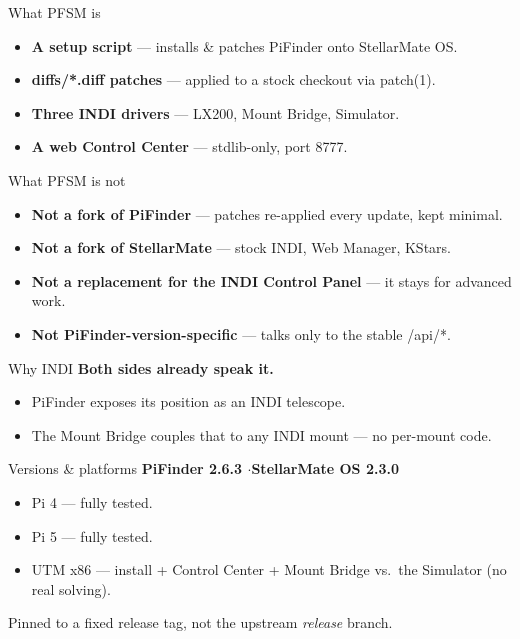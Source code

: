 \documentclass[12pt,english,aspectratio=1609]{beamer}
\newcommand{\code}[1]{{\ttfamily #1}}
\begin{document}
\begin{frame}[t]{What PFSM is}
\begin{itemize}
\item \textbf{A setup script} — installs \& patches PiFinder onto StellarMate OS.
\item \textbf{\code{diffs/*.diff} patches} — applied to a stock checkout via \code{patch(1)}.
\item \textbf{Three INDI drivers} — LX200, Mount Bridge, Simulator.
\item \textbf{A web Control Center} — stdlib-only, port 8777.
\end{itemize}
\end{frame}

\begin{frame}[t]{What PFSM is not}
\begin{itemize}
\item \textbf{Not a fork of PiFinder} — patches re-applied every update, kept minimal.
\item \textbf{Not a fork of StellarMate} — stock INDI, Web Manager, KStars.
\item \textbf{Not a replacement for the INDI Control Panel} — it stays for advanced work.
\item \textbf{Not PiFinder-version-specific} — talks only to the stable \code{/api/*}.
\end{itemize}
\end{frame}

\begin{frame}[t]{Why INDI}
\textbf{Both sides already speak it.}
\begin{itemize}
\item PiFinder exposes its position as an INDI telescope.
\item The Mount Bridge couples that to any INDI mount — no per-mount code.
\end{itemize}
\end{frame}

\begin{frame}[t]{Versions \& platforms}
\textbf{PiFinder 2.6.3 \quad$\cdot$\quad StellarMate OS 2.3.0}
\begin{itemize}
\item Pi 4 — fully tested.
\item Pi 5 — fully tested.
\item UTM x86 — install + Control Center + Mount Bridge vs.\ the Simulator (no real solving).
\end{itemize}
\medskip{}
Pinned to a fixed release tag, not the upstream \emph{release} branch.
\end{frame}
\end{document}
